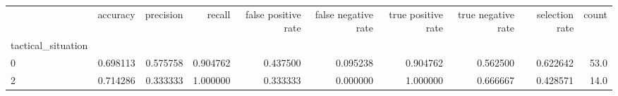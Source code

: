 \begin{tabular}{lrrrrrrrrr}
\toprule
{} &  accuracy &  precision &    recall &  false positive rate &  false negative rate &  true positive rate &  true negative rate &  selection rate &  count \\
tactical\_situation &           &            &           &                      &                      &                     &                     &                 &        \\
\midrule
0                  &  0.698113 &   0.575758 &  0.904762 &             0.437500 &             0.095238 &            0.904762 &            0.562500 &        0.622642 &   53.0 \\
2                  &  0.714286 &   0.333333 &  1.000000 &             0.333333 &             0.000000 &            1.000000 &            0.666667 &        0.428571 &   14.0 \\
\bottomrule
\end{tabular}
